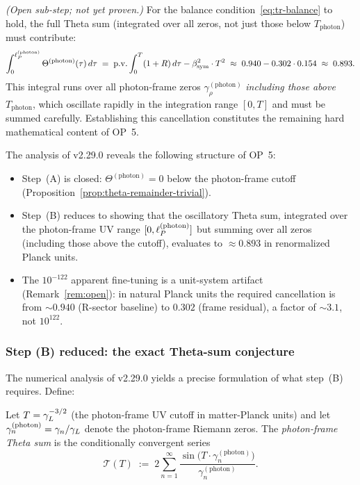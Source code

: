 \begin{proposition}
\label{prop:theta-required-B}
\emph{(Open sub-step; not yet proven.)}
For the balance condition~\eqref{eq:tr-balance} to hold, the full
Theta sum (integrated over all zeros, not just those below
$T_{\mathrm{photon}}$) must contribute:
\[
  \int_0^{\ell_P^{(\mathrm{photon})}}
  \Theta^{(\mathrm{photon})}(\tau)\,d\tau
  \;=\;
  \mathrm{p.v.}\int_0^T (1+R)\,d\tau - \beta_{\mathrm{sym}}^2\cdot T^2
  \;\approx\; 0.940 - 0.302\cdot 0.154
  \;\approx\; 0.893.
\]
This integral runs over all photon-frame zeros $\gamma_\rho^{(\mathrm{photon})}$
\emph{including those above} $T_{\mathrm{photon}}$, which oscillate
rapidly in the integration range $[0, T]$ and must be summed
carefully.
Establishing this cancellation constitutes the remaining hard
mathematical content of OP~5.
\end{proposition}

\begin{remark}
\label{rem:op5-structural-summary}
The analysis of v2.29.0 reveals the following structure of OP~5:
\begin{itemize}
  \item Step~(A) is closed: $\Theta^{(\mathrm{photon})}=0$ below
    the photon-frame cutoff (Proposition~\ref{prop:theta-remainder-trivial}).
  \item Step~(B) reduces to showing that the oscillatory Theta sum,
    integrated over the photon-frame UV range $[0,\ell_P^{(\mathrm{photon})}]$
    but summing over all zeros (including those above the cutoff),
    evaluates to $\approx 0.893$ in renormalized Planck units.
  \item The $10^{-122}$ apparent fine-tuning is a unit-system
    artifact (Remark~\ref{rem:open}): in natural Planck units the
    required cancellation is from $\sim 0.940$ (R-sector baseline)
    to $0.302$ (frame residual), a factor of $\sim 3.1$, not $10^{122}$.
\end{itemize}
\end{remark}

\subsubsection*{Step (B) reduced: the exact Theta-sum conjecture}

The numerical analysis of v2.29.0 yields a precise formulation of
what step~(B) requires. Define:

\begin{definition}
\label{def:theta-sum-B}
Let $T = \gamma_L^{-3/2}$ (the photon-frame UV cutoff in matter-Planck units)
and let $\gamma_n^{(\mathrm{photon})} = \gamma_n/\gamma_L$ denote the
photon-frame Riemann zeros. The \emph{photon-frame Theta sum} is the
conditionally convergent series
\[
  \mathcal{T}(T)
  \;:=\;
  2\sum_{n=1}^\infty
  \frac{\sin\!\bigl(T\cdot\gamma_n^{(\mathrm{photon})}\bigr)}
       {\gamma_n^{(\mathrm{photon})}}.
\]
\end{definition}

